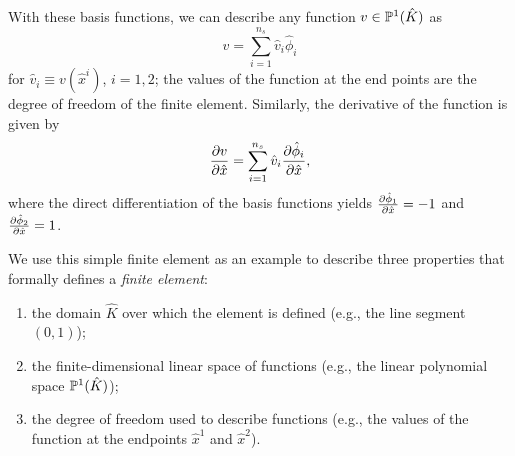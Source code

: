 With these basis functions, we can describe any function $v \in \mathbb{P}^1(\hat K)$ as
\begin{equation*}
  v = \sum_{i=1}^{n_s} \hat v_i \hat \phi_i
\end{equation*}
for $\hat v_i \equiv v(\hat x^i)$, $i = 1,2$; the values of the function at the end points are the degree of freedom of the finite element.  Similarly, the derivative of the function is given by
\begin{equation*}
  \frac{\partial v}{\partial \hat x} = \sum_{i=1}^{n_s} \hat v_i \frac{\partial \hat \phi_i}{\partial \hat x},
\end{equation*}
where the direct differentiation of the basis functions yields $\frac{\partial \hat \phi_1}{\partial \hat x} = -1$ and $\frac{\partial \hat \phi_2}{\partial \hat x} = 1$.

We use this simple finite element as an example to describe three properties that formally defines a \emph{finite element}:
\begin{enumerate}
\item the domain $\hat K$ over which the element is defined (e.g., the line segment $(0,1)$);
\item the finite-dimensional linear space of functions (e.g., the linear polynomial space $\mathbb{P}^1(\hat K)$);
\item the degree of freedom used to describe functions (e.g., the values of the function at the endpoints $\hat x^1$ and $\hat x^2$).
\end{enumerate}

%





